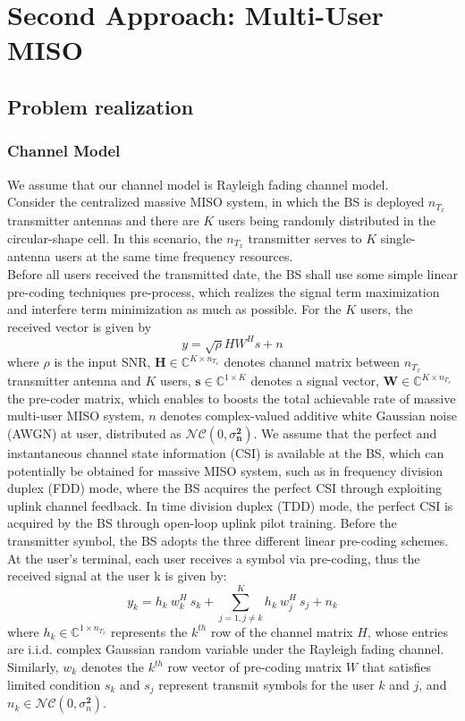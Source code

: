 \chapter{Second Approach: Multi-User MISO}

\section{Problem realization}

\subsection{Channel Model}
We assume that our channel model is Rayleigh fading channel model.\\
Consider the centralized massive MISO system, in which the BS is deployed $n_{T_x}$ transmitter antennas and there are $K$ users being randomly distributed in the circular-shape cell. In this scenario, the $n_{T_x}$ transmitter serves to $K$ single-antenna users at the same time frequency resources.\\
Before all users received the transmitted date, the BS shall use some simple linear pre-coding techniques pre-process, which realizes the signal term maximization and interfere term minimization as much as possible. For the $K$ users, the received vector is given by
\[ y = \sqrt{\rho} H W^H s + n \]
where $\rho$ is the input SNR, $\mathbf{H}\in\mathbb{C}^{{K \times n}_{T_x}}$ denotes channel matrix between $n_{T_x}$ transmitter antenna and $K$ users, $\mathbf{s}\in{\mathbb{C}}^{1 \times K}$ denotes a signal vector, $\mathbf{W}\in{\mathbb{C}}^{{K \times n}_{T_x}}$ the pre-coder  matrix, which enables to boosts the total achievable rate of massive multi-user MISO system, $n$ denotes complex-valued additive white Gaussian noise (AWGN) at user, distributed as $\mathcal{N} \mathcal{C} (0, \sigma^\mathbf{2}_\mathbf{n})$.
We assume that the perfect and instantaneous channel state information (CSI) is available at the BS, which can potentially be obtained for massive MISO system, such as in frequency division duplex (FDD) mode, where the BS acquires the perfect CSI through exploiting uplink channel feedback. In time division duplex (TDD) mode, the perfect CSI is acquired by the BS through open-loop uplink pilot training. Before the transmitter symbol, the BS adopts the three different linear pre-coding schemes.\\
At the user's terminal, each user receives a symbol via pre-coding, thus the received signal at the user k is given by:
\begin{equation}
    y_k=h_k\ w_k^H\ s_k+\sum_{j=1,j \neq k}^{K}{h_k\ w_j^H\ s_j}+n_k
\end{equation}
where $h_k \in \mathbb{C}^{1 \times n_{T_x}}$ represents the $k^{th}$ row of the channel matrix $H$, whose entries are i.i.d. complex Gaussian random variable under the Rayleigh fading channel. Similarly, $w_k$ denotes the $k^{th}$ row vector of pre-coding matrix $W$ that satisfies limited condition $s_k$ and $s_j$ represent transmit symbols for the user $k$ and $j$, and $n_k\in \mathcal{N} \mathcal{C}(0,\sigma^\mathbf{2}_n)$.

